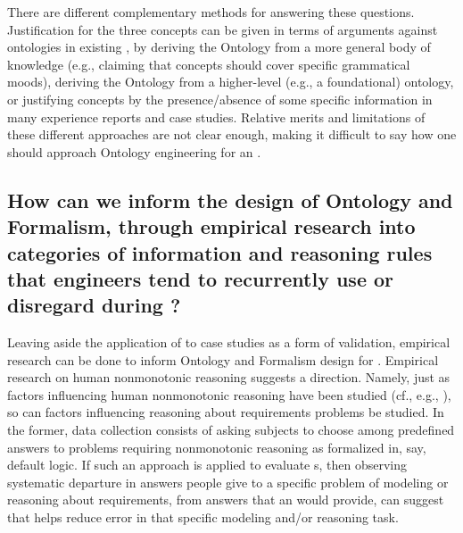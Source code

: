 \documentclass[10pt, final, conference, compsocconf]{IEEEtran}
\begin{document}
There are different complementary methods for answering these questions. Justification for the three concepts can be given in terms of arguments against ontologies in existing , by deriving the Ontology from a more general body of knowledge (e.g., claiming that concepts should cover specific grammatical moods), deriving the Ontology from a higher-level (e.g., a foundational) ontology, or justifying concepts by the presence/absence of some specific information in many experience reports and case studies. Relative merits and limitations of these different approaches are not clear enough, making it difficult to say how one should approach Ontology engineering for an .

\subsection{How can we inform the design of Ontology and Formalism, through empirical research into categories of information and reasoning rules that engineers tend to recurrently use or disregard during ?}\label{s:challenges:validation}
Leaving aside the application of  to case studies as a form of validation, empirical research can be done to inform Ontology and Formalism design for . Empirical research on human nonmonotonic reasoning suggests a direction. Namely, just as factors influencing human nonmonotonic reasoning have been studied (cf., e.g., \cite{Ford+2000:CI}), so can factors influencing reasoning about requirements problems be studied. In the former, data collection consists of asking subjects to choose among predefined answers to problems requiring nonmonotonic reasoning as formalized in, say, default logic. If such an approach is applied to evaluate s, then observing systematic departure in answers people give to a specific problem of modeling or reasoning about requirements, from answers that an  would provide, can suggest that  helps reduce error in that specific modeling and/or reasoning task.

\end{document}
